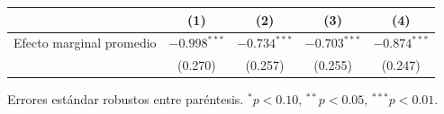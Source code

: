 
\begin{tabular}{lcccc}
\toprule
 & (1) & (2) & (3) & (4)\\
\midrule
Efecto marginal promedio & $-0.998^{***}$ & $-0.734^{***}$ & $-0.703^{***}$ & $-0.874^{***}$\\
 & (0.270) & (0.257) & (0.255) & (0.247)\\
\bottomrule
\end{tabular}
\par\vspace{3pt}
{\footnotesize\parbox{0.9\linewidth}{\centering Errores est\'andar robustos entre par\'entesis. $^{*}p<0.10$, $^{**}p<0.05$, $^{***}p<0.01$.}}
